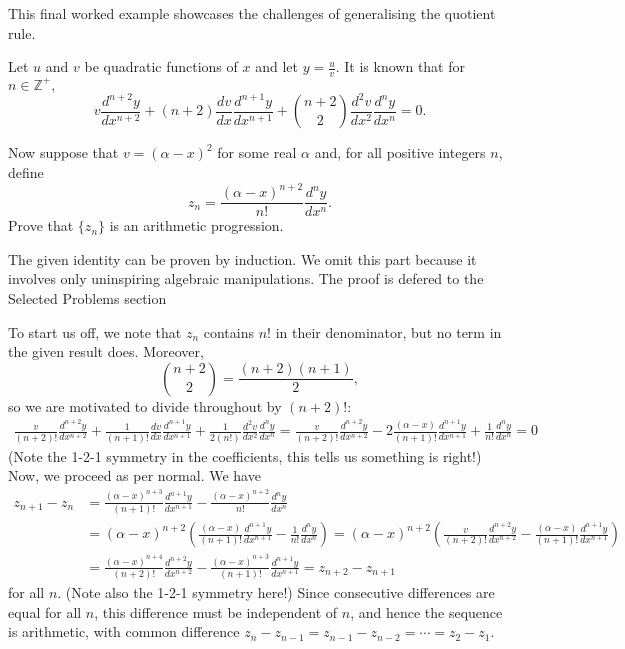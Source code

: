 \documentclass[../main.tex]{subfiles}
\begin{document}
This final worked example showcases the challenges of generalising the quotient rule.
\begin{example}\label{generalised-quotient-rule:p1}
Let $u$ and $v$ be quadratic functions of $x$ and let $y=\frac{u}{v}$. It is known that for $n\in \mathbb{Z}^+,$
$$v\frac{d^{n+2}y}{dx^{n+2}}+(n+2)\frac{dv}{dx}\frac{d^{n+1}y}{dx^{n+1}}+\binom{n+2}{2}\frac{d^{2}v}{dx^{2}}\frac{d^n{y}}{dx^{n}}=0.$$

Now suppose that $v=(\alpha-x)^2$ for some real $\alpha$ and, for all positive integers $n$, define
$$z_n=\frac{(\alpha-x)^{n+2}}{n!}\frac{d^{n}y}{dx^{n}}.$$
Prove that $\{z_n\}$ is an arithmetic progression.
\end{example}
\begin{remark}
The given identity can be proven by induction. We omit this part because it involves only uninspiring algebraic manipulations. The proof is defered to the Selected Problems section
\end{remark}
To start us off, we note that $z_n$ contains $n!$ in their denominator, but no term in the given result does. Moreover, $$\binom{n+2}{2}=\frac{(n+2)(n+1)}{2},$$ so we are motivated to divide throughout by $(n+2)!$:
\begin{align*}
    \frac{v}{(n+2)!}\frac{d^{n+2}y}{dx^{n+2}}+\frac{1}{(n+1)!}\frac{dv}{dx}\frac{d^{n+1}y}{dx^{n+1}}+\frac{1}{2(n!)}\frac{d^{2}v}{dx^{2}}\frac{d^n{y}}{dx^{n}}=\frac{v}{(n+2)!}\frac{d^{n+2}y}{dx^{n+2}}-2\frac{(\alpha-x)}{(n+1)!}\frac{d^{n+1}y}{dx^{n+1}}+\frac{1}{n!}\frac{d^n{y}}{dx^{n}}=0
\end{align*}
(Note the 1-2-1 symmetry in the coefficients, this tells us something is right!) Now, we proceed as per normal. We have
\begin{align*}
    z_{n+1}-z_{n}&=\frac{(\alpha-x)^{n+3}}{(n+1)!}\frac{d^{n+1}y}{dx^{n+1}}-\frac{(\alpha-x)^{n+2}}{n!}\frac{d^ny}{dx^n}\\
    &=(\alpha-x)^{n+2}\left(\frac{(\alpha-x)}{(n+1)!}\frac{d^{n+1}y}{dx^{n+1}}-\frac{1}{n!}\frac{d^ny}{dx^n}\right) = (\alpha-x)^{n+2}\left(\frac{v}{(n+2)!}\frac{d^{n+2}y}{dx^{n+2}}-\frac{(\alpha-x)}{(n+1)!}\frac{d^{n+1}y}{dx^{n+1}}\right)\\
    &=\frac{(\alpha-x)^{n+4}}{(n+2)!}\frac{d^{n+2}y}{dx^{n+2}}-\frac{(\alpha-x)^{n+3}}{(n+1)!}\frac{d^{n+1}y}{dx^{n+1}} = z_{n+2}-z_{n+1}
\end{align*}
for all $n$. (Note also the 1-2-1 symmetry here!) Since consecutive differences are equal for all $n$, this difference must be independent of $n$, and hence the sequence is arithmetic, with common difference $z_{n}-z_{n-1}=z_{n-1}-z_{n-2}=\cdots=z_2-z_1$.
\end{document}

